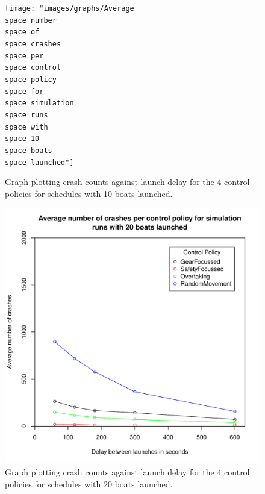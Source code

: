   \begin{figure}
  \begin{center}
    \texttt{[image: "images/graphs/Average\\space number\\space of\\space crashes\\space per\\space control\\space policy\\space for\\space simulation\\space runs\\space with\\space 10\\space boats\\space launched"]}
    \caption{Graph plotting crash counts against launch delay for the 4 control policies for schedules with 10 boats launched.}
    \label{experiments:fig:crash_counts_10_launches}
  \end{center}
  \end{figure}
  
  \begin{figure}
  \begin{center}
    \includegraphics[scale=0.8]{"images/graphs/Average number of crashes per control policy for simulation runs with 20 boats launched"}
    \caption{Graph plotting crash counts against launch delay for the 4 control policies for schedules with 20 boats launched.}
    \label{experiments:fig:crash_counts_20_launches}
  \end{center}
  \end{figure}
  
